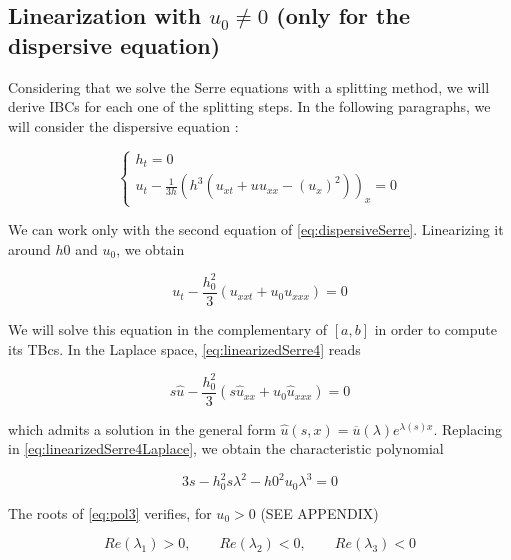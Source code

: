 \subsection{Linearization with $u_0 \neq 0$ (only for the dispersive equation)}

\indent Considering that we solve the Serre equations with a splitting method, we will derive IBCs for each one of the splitting steps. In the following paragraphs, we will consider the dispersive equation :

\begin{equation}
 \label{eq:dispersiveSerre}
	\begin{cases}
		h_t = 0 \\
		u_t - \frac{1}{3h} \left( h^3 \left( u_{xt} + uu_{xx} - (u_x)^2\right) \right)_x = 0
	\end{cases}
\end{equation}

\indent We can work only with the second equation of \eqref{eq:dispersiveSerre}. Linearizing it around $h0$ and $u_0$, we obtain

\begin{equation}
	\label{eq:linearizedSerre4}
	u_t - \frac{h_0^2}{3}(u_{xxt}+u_0u_{xxx}) = 0
\end{equation}

\indent We will solve this equation in the complementary of $[a,b]$ in order to compute its TBcs. In the Laplace space, \eqref{eq:linearizedSerre4} reads

\begin{equation}
	\label{eq:linearizedSerre4Laplace}
	s \hat{u} - \frac{h_0^2}{3}(s\hat{u}_{xx}+u_0\hat{u}_{xxx}) = 0
\end{equation}

\noindent which admits a solution in the general form $\hat{u}(s,x) = \overline{u}(\lambda)e^{\lambda(s)x}$. Replacing in \eqref{eq:linearizedSerre4Laplace}, we obtain the characteristic polynomial

\begin{equation}
\label{eq:pol3}
3s - h_0^2s\lambda^2 - h0^2u_0\lambda^3 = 0
\end{equation}

\indent The roots of \eqref{eq:pol3} verifies, for $u_0 > 0$ (SEE APPENDIX)

\begin{equation*}
	Re(\lambda_1) > 0, \qquad Re(\lambda_2) < 0, \qquad Re(\lambda_3) < 0 
\end{equation*}

